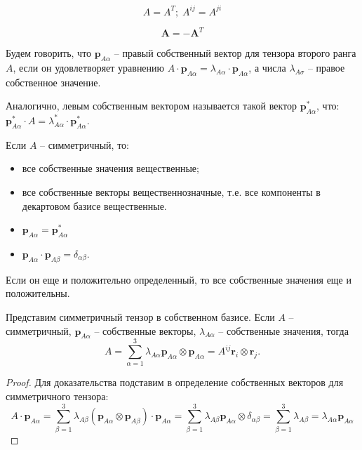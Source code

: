 
\begin{definition}
	\begin{equation*}
		A=A^T;\;A^{ij}=A^{ji}
	\end{equation*}
\end{definition}

\begin{definition}
	\begin{equation*}
		\mathbf{A} = -\mathbf{A}^T
	\end{equation*}
\end{definition}

\begin{definition}
	Будем говорить, что $\mathbf{p}_{A\alpha}$ -- правый собственный вектор для тензора второго ранга $A$, если
	он удовлетворяет уравнению $A \cdot \mathbf{p}_{A\alpha} = \lambda_{A\alpha} \cdot \mathbf{p}_{A\alpha}$, а числа $\lambda_{A\sigma}$ -- правое собственное значение.
	
	Аналогично, левым собственным вектором называется такой вектор $\mathbf{p}^*_{A\alpha}$, что:
	$\mathbf{p}^*_{A\alpha} \cdot A = \lambda^*_{A\alpha} \cdot \mathbf{p}^*_{A\alpha}$.
\end{definition}

\begin{corollary}
	Если $A$ -- симметричный, то:
	\begin{itemize}
		\item все собственные значения вещественные;
		\item все собственные векторы вещественнозначные, т.е. все компоненты в декартовом базисе
		вещественные.
		\item $\mathbf{p}_{A\alpha} = \mathbf{p}^*_{A\alpha}$
		\item $\mathbf{p}_{A\alpha} \cdot \mathbf{p}_{A\beta} = \delta_{\alpha\beta}.$
	\end{itemize}
	
	Если он еще и положительно определенный, то все собственные значения еще и положительны.
\end{corollary}
\begin{corollary}
	Представим симметричный тензор в собственном базисе. Если $A$ -- симметричный,
	$\mathbf{p}_{A\alpha}$ -- собственные векторы, $\lambda_{A\alpha}$ -- собственные значения,
	тогда
	\[
	A = \sum_{\alpha=1}^3 \lambda_{A\alpha} \mathbf{p}_{A\alpha} \otimes \mathbf{p}_{A\alpha}
	= A^{ij} \mathbf{r}_i \otimes \mathbf{r}_j.
	\]
	\begin{proof}
		Для доказательства подставим в определение собственных векторов для симметричного тензора:
		\[
		A \cdot \mathbf{p}_{A\alpha}
		= \sum_{\beta=1}^3 \lambda_{A\beta} (\mathbf{p}_{A\alpha}\otimes \mathbf{p}_{A\beta}) \cdot \mathbf{p}_{A\alpha}
		= \sum_{\beta=1}^3 \lambda_{A\beta} \mathbf{p}_{A\alpha} \otimes \delta_{\alpha\beta}
		= \sum_{\beta=1}^3 \lambda_{A\beta} 
		= \lambda_{A\alpha} \mathbf{p}_{A\alpha}
		\]
	\end{proof}
\end{corollary}

